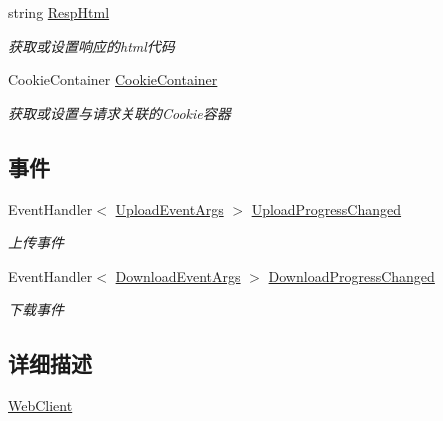 \begin{DoxyCompactItemize}
string \hyperlink{class_x_c_l_net_tools_1_1_file_handler_1_1_web_client_a67e90e96bd067171c16cb84d75f66c3a}{Resp\+Html}
\begin{DoxyCompactList}\small\item\em 获取或设置响应的html代码 \end{DoxyCompactList}\item 
Cookie\+Container \hyperlink{class_x_c_l_net_tools_1_1_file_handler_1_1_web_client_adeaa1201074e43df3743d76ea77cf06e}{Cookie\+Container}
\begin{DoxyCompactList}\small\item\em 获取或设置与请求关联的\+Cookie容器 \end{DoxyCompactList}\end{DoxyCompactItemize}
\subsection*{事件}
\begin{DoxyCompactItemize}
\item 
Event\+Handler$<$ \hyperlink{class_x_c_l_net_tools_1_1_file_handler_1_1_upload_event_args}{Upload\+Event\+Args} $>$ \hyperlink{class_x_c_l_net_tools_1_1_file_handler_1_1_web_client_abe950fa329508b4c52e3181aeb97585f}{Upload\+Progress\+Changed}
\begin{DoxyCompactList}\small\item\em 上传事件 \end{DoxyCompactList}\item 
Event\+Handler$<$ \hyperlink{class_x_c_l_net_tools_1_1_file_handler_1_1_download_event_args}{Download\+Event\+Args} $>$ \hyperlink{class_x_c_l_net_tools_1_1_file_handler_1_1_web_client_aa1e50d608381b728356547eff9f80213}{Download\+Progress\+Changed}
\begin{DoxyCompactList}\small\item\em 下载事件 \end{DoxyCompactList}\end{DoxyCompactItemize}


\subsection{详细描述}
\hyperlink{class_x_c_l_net_tools_1_1_file_handler_1_1_web_client}{Web\+Client} 



